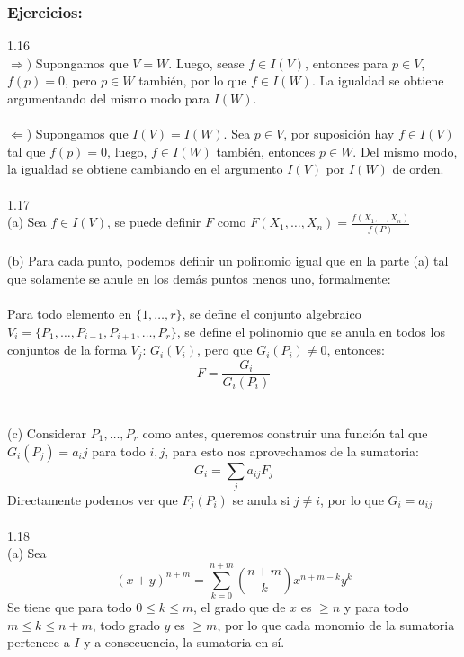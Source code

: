 \documentclass{article}
\begin{document}
\subsubsection*{Ejercicios:}
1.16
\\
$\Longrightarrow)$ Supongamos que $V=W$. Luego, sease $f \in I(V)$, entonces para $p \in V$, $f(p)=0$, pero $p \in W$ también, por lo que $f \in I(W)$. La igualdad se obtiene argumentando del mismo modo para $I(W)$.
\\
\\
$\Longleftarrow$) Supongamos que $I(V)=I(W)$. Sea $p \in V$, por suposición hay $f \in I(V)$ tal que $f(p)=0$, luego, $f \in I(W)$ también, entonces $p \in W$. Del mismo modo, la igualdad se obtiene cambiando en el argumento $I(V)$ por $I(W)$ de orden.
\\
\\
1.17
\\
(a) Sea $f \in I(V)$, se puede definir $F$ como $F(X_1, \dots,X_n)=\frac{f(X_1, \dots , X_n)}{f(P)}$
\\
\\
(b) Para cada punto, podemos definir un polinomio igual que en la parte (a) tal que solamente se anule en los demás puntos menos uno, formalmente:
\\
\\
Para todo elemento en $\{1,\dots,r \}$, se define el conjunto algebraico $V_i=\{P_1,\dots,P_{i-1},P_{i+1},\dots, P_r \}$, se define el polinomio que se anula en todos los conjuntos de la forma $V_j$: $G_{i}(V_i)$, pero que $G_{i}(P_i) \neq 0$, entonces:
\begin{equation*}
    F = \frac{G_i}{G_i(P_i)}
\end{equation*}
\\
\\
(c) Considerar $P_1,\dots, P_r$ como antes, queremos construir una función tal que $G_i(P_j)=a_ij$ para todo $i,j$, para esto nos aprovechamos de la sumatoria:
\begin{equation*}
    G_i = \sum_{j} a_{ij} F_j
\end{equation*}
Directamente podemos ver que $F_j(P_i)$ se anula si $j \neq i$, por lo que $G_i=a_{ij}$
\\
\\
1.18
\\
(a) Sea
\begin{equation*}
    (x+y)^{n+m} = \sum_{k=0}^{n+m} \binom{n+m}{k} x^{n+m-k} y^k
\end{equation*}
Se tiene que para todo $0 \leq k \leq m$, el grado que de $x$ es $\geq n$ y para todo $m \leq k \leq n+m$, todo grado $y$ es $\geq m$, por lo que cada monomio de la sumatoria pertenece a $I$ y a consecuencia, la sumatoria en sí.
\end{document}
